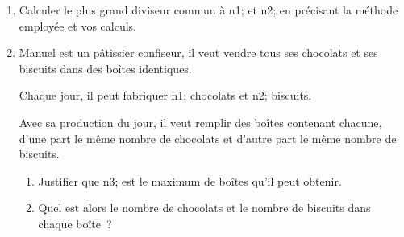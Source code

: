 \documentclass[exercice]{thedocument}%
\begin{document}
%
\begin{enumerate}
    \item Calculer le plus grand diviseur commun à \<n1; et \<n2; en précisant
    la méthode employée et vos calculs.
    \item Manuel est un pâtissier confiseur, il veut vendre tous ses chocolats
    et ses biscuits dans des boîtes identiques.\par\noindent Chaque jour, il
    peut fabriquer \<n1; chocolats et \<n2; biscuits.\par\noindent Avec sa
    production du jour, il veut remplir des boîtes contenant chacune, d'une
    part le même nombre de chocolats et d'autre part le même nombre de
    biscuits.
    \begin{enumerate}
        \item Justifier que \<n3; est le maximum de boîtes qu'il peut obtenir.
        \item Quel est alors le nombre de chocolats et le nombre de biscuits
        dans chaque boîte~?
    \end{enumerate}
\end{enumerate}
\end{document}
